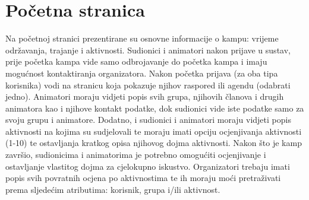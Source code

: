 		\section{Početna stranica}
		Na početnoj stranici prezentirane su osnovne informacije o kampu: vrijeme održavanja, trajanje i aktivnosti. Sudionici i animatori nakon prijave u sustav, prije početka kampa vide samo odbrojavanje do početka kampa i imaju mogućnost kontaktiranja organizatora. Nakon početka prijava (za oba tipa korisnika) vodi na stranicu koja pokazuje njihov raspored ili agendu (odabrati jedno). Animatori moraju vidjeti popis svih grupa, njihovih članova i drugih animatora kao i njihove kontakt podatke, dok sudionici vide iste podatke samo za svoju grupu i animatore. Dodatno, i sudionici i animatori moraju vidjeti popis aktivnosti na kojima su sudjelovali te moraju imati opciju ocjenjivanja aktivnosti (1-10) te ostavljanja kratkog opisa njihovog dojma aktivnosti. Nakon što je kamp završio, sudionicima i animatorima je potrebno omogućiti ocjenjivanje i ostavljanje vlastitog dojma za cjelokupno iskustvo. Organizatori trebaju imati popis svih povratnih ocjena po aktivnostima te ih moraju moći pretraživati prema sljedećim atributima: korisnik, grupa i/ili aktivnost.